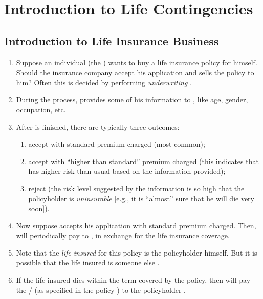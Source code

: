 \section{Introduction to Life Contingencies}
\subsection{Introduction to Life Insurance Business}
\begin{enumerate}
\item Suppose an individual  (the ) wants to buy
a life insurance policy for himself.  Should the insurance company
 accept his application and sells the policy 
to him? Often this is decided by performing \emph{underwriting} .

\item During the   process,  provides some of his
information to , like age, gender, occupation, etc.

\item After  is finished, there are typically three outcomes:
\begin{enumerate}

\item accept with standard premium charged (most common);

\item accept with ``higher than standard'' premium charged (this indicates that
 has higher risk than usual based on the information provided);

\item reject (the risk level suggested by the information is so high that the
policyholder is \emph{uninsurable} [e.g., it is ``almost'' sure that he will
die very soon]).
\end{enumerate}

\item Now suppose  accepts his application with standard premium
charged. Then,  will periodically pay  
to , in exchange for the life insurance coverage.

\item Note that the \emph{life insured} for this policy is the policyholder
 himself. But it is possible that the life insured is someone else
.

\item If the life insured  dies within the term covered by the
policy, then  will pay the /  (as specified in the policy
) to the policyholder .


\end{enumerate}
